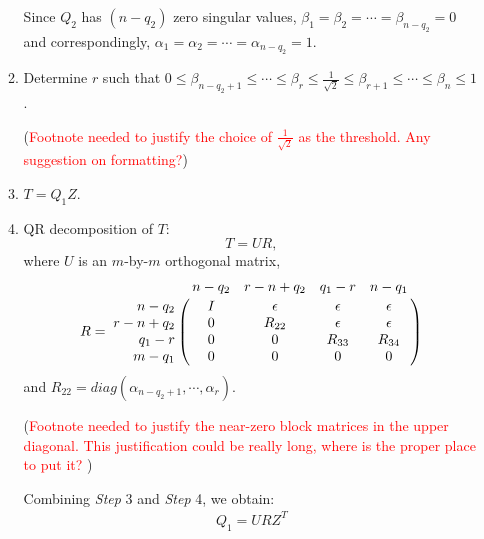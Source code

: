 \begin{enumerate}
\begin{enumerate}
                    Since $Q_2$ has $(n-q_2)$ zero singular values, $\beta_{1} = \beta_{2} = \cdots = \beta_{n-q_2} = 0$ and correspondingly, $\alpha_1 = \alpha_2 = \cdots = \alpha_{n-q_2} = 1$.
                \item Determine $r$ such that $0 \leq \beta_{n-q_2+1} \leq \cdots \leq \beta_{r} \leq \frac{1}{\sqrt{2}} \leq \beta_{r+1} \leq \cdots \leq \beta_{n} \leq 1$. 
                
                (\textcolor{red}{Footnote needed to justify the choice of $\frac{1}{\sqrt{2}}$ as the threshold. Any suggestion on formatting?})
                
                \item $T = Q_1Z$.
                \item QR decomposition of $T$:
                    \begin{equation}
                        T = UR,
                    \end{equation}
                    where $U$ is an $m$-by-$m$ orthogonal matrix,
                    \begin{displaymath}
                        R = \bordermatrix{ & n-q_2 & r-n+q_2 & q_1-r & n-q_1 \cr
                                    \hfill n-q_2 & I & \epsilon & \epsilon & \epsilon \cr
                                    \hfill r-n+q_2 & 0 & R_{22} & \epsilon & \epsilon \cr
                                    \hfill q_1-r & 0 & 0 & R_{33} & R_{34} \cr
                                    \hfill m-q_1 & 0 & 0 & 0 & 0}
                    \end{displaymath}
                    and $R_{22} = diag(\alpha_{n-q_2+1}, \cdots, \alpha_{r})$.
                    
                    (\textcolor{red}{Footnote needed to justify the near-zero block matrices in the upper diagonal. This justification could be really long, where is the proper place to put it?} ) 
                    
                    Combining \textit{Step} 3 and \textit{Step} 4, we obtain:
                    \begin{align} \label{eq-q_1-case1}
                        Q_1 = URZ^{T}
                    \end{align}
                    

\end{enumerate}
\end{enumerate}
